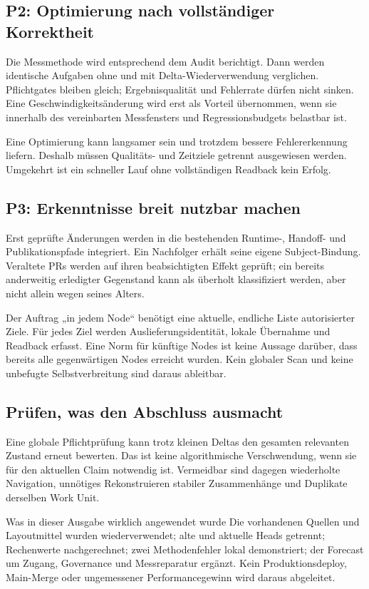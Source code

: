 \begin{cols}
\subsection*{P2: Optimierung nach vollständiger Korrektheit}
Die Messmethode wird entsprechend dem Audit berichtigt. Dann werden identische Aufgaben ohne und mit Delta-Wiederverwendung verglichen. Pflichtgates bleiben gleich; Ergebnisqualität und Fehlerrate dürfen nicht sinken. Eine Geschwindigkeitsänderung wird erst als Vorteil übernommen, wenn sie innerhalb des vereinbarten Messfensters und Regressionsbudgets belastbar ist.

Eine Optimierung kann langsamer sein und trotzdem bessere Fehlererkennung liefern. Deshalb müssen Qualitäts- und Zeitziele getrennt ausgewiesen werden. Umgekehrt ist ein schneller Lauf ohne vollständigen Readback kein Erfolg.

\subsection*{P3: Erkenntnisse breit nutzbar machen}
Erst geprüfte Änderungen werden in die bestehenden Runtime-, Handoff- und Publikationspfade integriert. Ein Nachfolger erhält seine eigene Subject-Bindung. Veraltete PRs werden auf ihren beabsichtigten Effekt geprüft; ein bereits anderweitig erledigter Gegenstand kann als überholt klassifiziert werden, aber nicht allein wegen seines Alters.

Der Auftrag „in jedem Node“ benötigt eine aktuelle, endliche Liste autorisierter Ziele. Für jedes Ziel werden Auslieferungsidentität, lokale Übernahme und Readback erfasst. Eine Norm für künftige Nodes ist keine Aussage darüber, dass bereits alle gegenwärtigen Nodes erreicht wurden. Kein globaler Scan und keine unbefugte Selbstverbreitung sind daraus ableitbar.

\subsection*{Prüfen, was den Abschluss ausmacht}
Eine globale Pflichtprüfung kann trotz kleinen Deltas den gesamten relevanten Zustand erneut bewerten. Das ist keine algorithmische Verschwendung, wenn sie für den aktuellen Claim notwendig ist. Vermeidbar sind dagegen wiederholte Navigation, unnötiges Rekonstruieren stabiler Zusammenhänge und Duplikate derselben Work Unit.

\begin{boundary}{Was in dieser Ausgabe wirklich angewendet wurde}
Die vorhandenen Quellen und Layoutmittel wurden wiederverwendet; alte und aktuelle Heads getrennt; Rechenwerte nachgerechnet; zwei Methodenfehler lokal demonstriert; der Forecast um Zugang, Governance und Messreparatur ergänzt. Kein Produktionsdeploy, Main-Merge oder ungemessener Performancegewinn wird daraus abgeleitet.
\end{boundary}
\end{cols}

